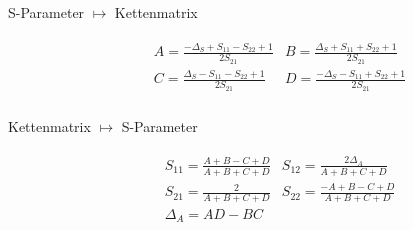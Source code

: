 \begin{description}
\item[S-Parameter $\longmapsto$ Kettenmatrix]
\renewcommand{\arraystretch}{1.6}
\begin{align*}
\begin{array}{cc}
A = \frac{- \Delta_S + S_{11} - S_{22} + 1}{2 S_{21}} & B = \frac{\Delta_S + S_{11} + S_{22} + 1}{2 S_{21}} \\
C = \frac{\Delta_S - S_{11} - S_{22} + 1}{2 S_{21}} & D = \frac{- \Delta_S - S_{11} + S_{22} + 1}{2 S_{21}} \\
\end{array}
\end{align*}

\item[Kettenmatrix $\longmapsto$ S-Parameter]
\begin{align*}
\begin{array}{cc}
S_{11} = \frac{A+B-C+D}{A+B+C+D} & S_{12} = \frac{2\Delta_A}{A+B+C+D} \\
S_{21} = \frac{2}{A+B+C+D} & S_{22} = \frac{-A+B-C+D}{A+B+C+D} \\
\Delta_A = AD-BC &
\end{array}
\end{align*}
\renewcommand{\arraystretch}{1}


\end{description}
